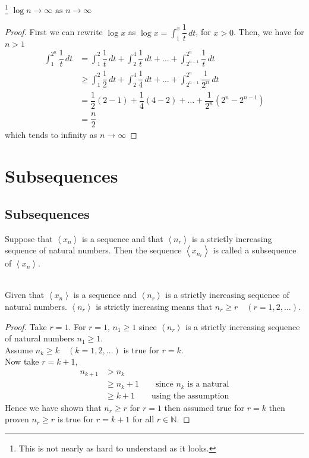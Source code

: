 \documentclass[10pt, a4paper]{article}
\newcommand{\N}{\mathbb{N}}
\newcommand{\limas}[3][n]{#2 \rightarrow #3 \text{ as } #1 \rightarrow \infty}
\newcommand{\seq}[1][x_n]{\left\langle #1 \right\rangle}
\begin{document}
\begin{theorem}\label{thm_logdiverge}\footnote{This is not nearly as hard to understand as it looks.}
    $\limas{\log{n}}{\infty}$
    \begin{proof}
        First we can rewrite $\log{x}$ as $\displaystyle\log{x} = \int_{1}^{x}{\dfrac{1}{t}}\,dt$, for $x > 0$. Then, we have for $n > 1$
        \begin{align*}
            \int_{1}^{2 ^ n}{\dfrac{1}{t}}\,dt &= \int_{1}^{2}{\dfrac{1}{t}}\,dt + \int_{2}^{4}{\dfrac{1}{t}}\,dt + \dots + \int_{2 ^ {n-1}}^{2 ^ n}{\dfrac{1}{t}}\,dt \\
            &\geq \int_{1}^{2}{\dfrac{1}{2}}\,dt + \int_{2}^{4}{\dfrac{1}{4}}\,dt + \dots + \int_{2 ^ {n-1}}^{2 ^ n}{\dfrac{1}{2 ^ n}}\,dt \\
            &= \dfrac{1}{2}(2 - 1) + \dfrac{1}{4}(4 - 2) + \dots + \dfrac{1}{2 ^ n}(2 ^ n - 2 ^ {n - 1}) \\
            &= \dfrac{n}{2}
        \end{align*}
        which tends to infinity as $n \rightarrow \infty$
    \end{proof}
\end{theorem}

\newpage

\section{Subsequences}

\subsection{Subsequences}
Suppose that $\seq$ is a sequence and that $\seq[n_r]$ is a strictly increasing sequence of natural numbers. Then the sequence $\seq[x_{n_r}]$ is called a subsequence of $\seq$. \\
\\
\begin{remark}\label{remark_subseq_nrgeqr}
Given that $\seq$ is a sequence and $\seq[n_r]$ is a strictly increasing sequence of natural numbers. $\seq[n_r]$ is strictly increasing means that $n_r \geq r\quad(r = 1, 2,\dots).$
\begin{proof}
    Take $r = 1$. For $r = 1$, $n_1 \geq 1$ since $\seq[n_r]$ is a strictly increasing sequence of natural numbers $n_1 \geq 1$. \\
    Assume $n_k \geq k\quad(k = 1, 2,\dots)$ is true for $r = k$. \\
    Now take $r = k + 1$,
    \begin{align*}
        n_{k + 1} &> n_k \\
        &\geq n_k + 1\qquad\text{since $n_k$ is a natural} \\
        &\geq k + 1\qquad\text{using the assumption}
    \end{align*}
    Hence we have shown that $n_r \geq r$ for $r = 1$ then assumed true for $r = k$ then proven $n_r \geq r$ is true for $r = k + 1$ for all $r \in \N$.
\end{proof}
\end{remark}
\end{document}
